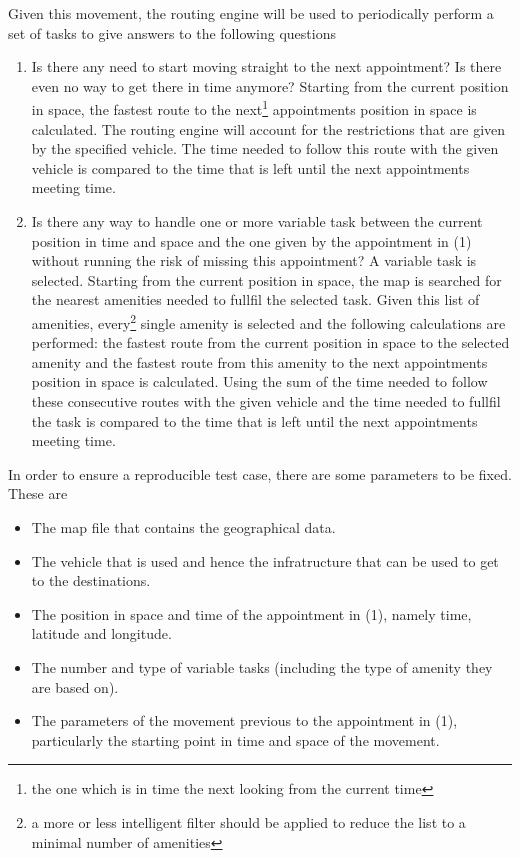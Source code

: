 Given this movement, the routing engine will be used to periodically perform a set of tasks to give answers to the following questions
\begin{enumerate}
	\item Is there any need to start moving straight to the next appointment? Is there even no way to get there in time anymore?\newline
	Starting from the current position in space, the fastest route to the next\footnote{the one which is in time the next looking from the current time} appointments position in space is calculated. The routing engine will account for the restrictions that are given by the specified vehicle. The time needed to follow this route with the given vehicle is compared to the time that is left until the next appointments meeting time.
	
	\item Is there any way to handle one or more variable task between the current position in time and space and the one given by the appointment in (1) without running the risk of missing this appointment?\newline
	A variable task is selected. Starting from the current position in space, the map is searched for the nearest amenities needed to fullfil the selected task. Given this list of amenities, every\footnote{a more or less intelligent filter should be applied to reduce the list to a minimal number of amenities} single amenity is selected and the following calculations are performed: the fastest route from the current position in space to the selected amenity and the fastest route from this amenity to the next appointments position in space is calculated. Using the sum of the time needed to follow these consecutive routes with the given vehicle and the time needed to fullfil the task is compared to  the time that is left until the next appointments meeting time.
\end{enumerate}

In order to ensure a reproducible  test case, there are some parameters to be fixed. These are
\begin{itemize}
	\item The map file that contains the geographical data.
	\item The vehicle that is used and hence the infratructure that can be used to get to the destinations.
	\item The position in space and time of the appointment in (1), namely time, latitude and longitude.
	\item The number and type of variable tasks (including the type of amenity they are based on).
	\item The parameters of the movement previous to the appointment in (1), particularly the starting point in time and space of the movement.
\end{itemize}
	
	